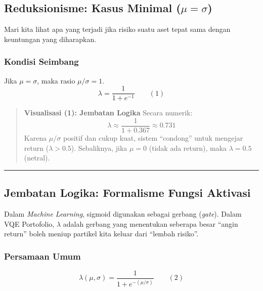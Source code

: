 \hypertarget{reduksionisme-kasus-minimal-mu-sigma}{%
\subsection{\texorpdfstring{Reduksionisme: Kasus Minimal (\(\mu = \sigma\))}{Reduksionisme: Kasus Minimal (\textbackslash mu = \textbackslash sigma)}}\label{reduksionisme-kasus-minimal-mu-sigma}}

Mari kita lihat apa yang terjadi jika risiko suatu aset tepat sama dengan keuntungan yang diharapkan.

\hypertarget{a.-kondisi-seimbang}{%
\subsubsection{Kondisi Seimbang}\label{a.-kondisi-seimbang}}

Jika \(\mu = \sigma\), maka rasio \(\mu/\sigma = 1\). \[ \lambda = \frac{1}{1 + e^{-1}} \qquad (1) \]

\begin{quote}
\textbf{Visualisasi (1): Jembatan Logika} Secara numerik: \[ \lambda \approx \frac{1}{1 + 0.367} \approx 0.731 \] Karena \(\mu/\sigma\) positif dan cukup kuat, sistem ``condong'' untuk mengejar return (\(\lambda > 0.5\)). Sebaliknya, jika \(\mu = 0\) (tidak ada return), maka \(\lambda = 0.5\) (netral).
\end{quote}

\begin{center}\rule{0.5\linewidth}{0.5pt}\end{center}

\hypertarget{jembatan-logika-formalisme-fungsi-aktivasi}{%
\subsection{Jembatan Logika: Formalisme Fungsi Aktivasi}\label{jembatan-logika-formalisme-fungsi-aktivasi}}

Dalam \emph{Machine Learning}, sigmoid digunakan sebagai gerbang (\emph{gate}). Dalam VQE Portofolio, \(\lambda\) adalah gerbang yang menentukan seberapa besar ``angin return'' boleh meniup partikel kita keluar dari ``lembah risiko''.

\hypertarget{a.-persamaan-umum}{%
\subsubsection{Persamaan Umum}\label{a.-persamaan-umum}}

\[ \lambda(\mu, \sigma) = \frac{1}{1 + e^{-(\mu/\sigma)}} \qquad (2) \]

